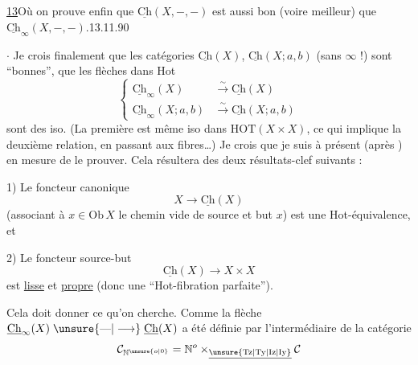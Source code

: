 \uline{13}\quad Où on prouve enfin que $\underline{\mathrm{Ch}}(X,-,-)$ est aussi bon (voire meilleur) que $\underline{\mathrm{Ch}}_{\infty}(X,-,-)$.\hfill 13.11.90

$\cdot$ Je crois finalement que les catégories $\underline{\mathrm{Ch}}(X)$, $\underline{\mathrm{Ch}}(X;a,b)$ (sans  $\infty$ !) sont ``bonnes'', que les flèches  dans Hot
\[
\left\{\begin{aligned}
\underline{\mathrm{Ch}}_{\infty}(X)&\xrightarrow{\sim}\underline{\mathrm{Ch}}(X)\\
\underline{\mathrm{Ch}}_{\infty}(X;a,b)&\xrightarrow{\sim}\underline{\mathrm{Ch}}(X;a,b)
\end{aligned}\right.
\]
sont des iso. (La première est même iso dans $\mathrm{HOT}(X\times X)$, ce qui implique la deuxième relation, en passant aux fibres\ldots) Je crois que je suis à présent (après ) en mesure de le prouver. Cela résultera des deux résultats-clef suivants :

1) Le foncteur canonique
\[
X\longrightarrow\underline{\mathrm{Ch}}(X)
\]
(associant à  $x\in\mathrm{Ob}\,X$ le chemin vide de source et but $x$) est une Hot-équivalence, et

2) Le foncteur source-but
\[
\underline{\mathrm{Ch}}(X)\longrightarrow X\times X
\]
est \uline{lisse} et \uline{propre} (donc une ``Hot-fibration parfaite'').

Cela doit donner ce qu'on cherche. Comme la flèche $\underline{\mathrm{Ch}}_{\infty}(X)\mathrel{\unsure{\text{---}|\longrightarrow}}\underline{\mathrm{Ch}}(X)$  a été définie par l'intermédiaire  de la catégorie
\[
\mathcal C_{\mathbb N^{\unsure{o|0}}}=\mathbb N^o\times_{\underline{\unsure{\mathrm{Tz}|\mathrm{Ty}|\mathrm{Iz}|\mathrm{Iy}}}}\mathcal C
\]
